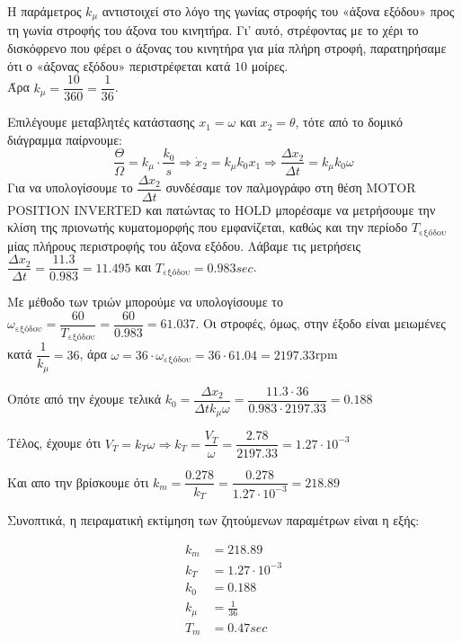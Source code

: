 Η παράμετρος $k_μ$ αντιστοιχεί στο λόγο της γωνίας στροφής του «άξονα εξόδου» προς τη γωνία στροφής του άξονα του κινητήρα. Γι' αυτό, στρέφοντας με το χέρι το δισκόφρενο που φέρει ο άξονας του κινητήρα για μία πλήρη στροφή, παρατηρήσαμε ότι ο «άξονας εξόδου» περιστρέφεται κατά $10$ μοίρες.\\ Άρα $k_μ = \dfrac{10}{360} = \dfrac{1}{36}$.

Επιλέγουμε μεταβλητές κατάστασης $x_1 = ω$ και $x_2 = θ$, τότε από το δομικό διάγραμμα παίρνουμε:
\begin{equation}
    \frac{Θ}{Ω} = k_μ \cdot \frac{k_0}{s} \Rightarrow \dot{x}_2 = k_μk_0x_1 \Rightarrow \frac{Δx_2}{Δt} = k_μk_0ω
    \label{eq1}
\end{equation}
Για να υπολογίσουμε το $\dfrac{Δx_2}{Δt}$ συνδέσαμε τον παλμογράφο στη θέση MOTOR POSITION INVERTED και πατώντας το HOLD μπορέσαμε να μετρήσουμε την κλίση της πριονωτής κυματομορφής που εμφανίζεται, καθώς και την
περίοδο $T_{\text{εξόδου}}$ μίας πλήρους περιστροφής του άξονα εξόδου. Λάβαμε τις μετρήσεις $\dfrac{Δx_2}{Δt} = \dfrac{11.3}{0.983} = 11.495$ και $T_{\text{εξόδου}} = 0.983sec$. 

Με μέθοδο των τριών μπορούμε να υπολογίσουμε το $ω_{\text{εξόδου}} = \dfrac{60}{T_{\text{εξόδου}}} = \dfrac{60}{0.983} = 61.037$. Οι στροφές, όμως, στην έξοδο είναι μειωμένες κατά $\dfrac{1}{k_μ} = 36$, άρα $ω = 36 \cdot ω_{\text{εξόδου}} = 36 \cdot 61.04 = 2197.33$rpm

Οπότε από την  έχουμε τελικά $k_0 = \dfrac{Δx_2}{Δt k_μ ω} = \dfrac{11.3 \cdot 36}{0.983 \cdot 2197.33} = 0.188$

Τέλος, έχουμε ότι $V_T = k_T ω \Rightarrow k_T = \dfrac{V_T}{ω} = \dfrac{2.78}{2197.33} = 1.27 \cdot 10^{-3}$

Και απο την  βρίσκουμε ότι $k_m = \dfrac{0.278}{k_T} = \dfrac{0.278}{1.27 \cdot 10^{-3}} = 218.89$

Συνοπτικά, η πειραματική εκτίμηση των ζητούμενων παραμέτρων είναι η εξής:

\begin{align*}
    k_m &= 218.89 \\
    k_T &= 1.27 \cdot 10^{-3} \\
    k_0 &= 0.188 \\
    k_μ &= \frac{1}{36} \\
    T_m &= 0.47sec
\end{align*}